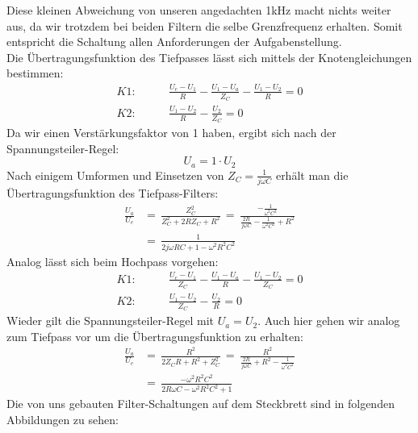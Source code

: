 Diese kleinen Abweichung von unseren angedachten 1\si{\kilo\hertz} macht nichts weiter aus, da wir trotzdem bei beiden Filtern die selbe Grenzfrequenz erhalten.
Somit entspricht die Schaltung allen Anforderungen der Aufgabenstellung.\\
Die Übertragungsfunktion des Tiefpasses lässt sich mittels der Knotengleichungen bestimmen:
\begin{align*}
K1:\qquad &\frac{U_{e}-U_{1}}{R}-\frac{U_{1}-U_{a}}{Z_{C}}-\frac{U_{1}-U_{2}}{R}=0\\
K2:\qquad &\frac{U_{1}-U_{2}}{R}-\frac{U_{2}}{Z_{C}}=0
\end{align*}
Da wir einen Verstärkungsfaktor von 1 haben, ergibt sich nach der Spannungsteiler-Regel:
$$U_{a}=1\cdot U_{2}$$
Nach einigem Umformen und Einsetzen von $Z_{C}=\frac{1}{j\omega C}$ erhält man die Übertragungsfunktion des Tiefpass-Filters:
\begin{align*}
\frac{U_{a}}{U_{e}}&=\,\frac{Z_{C}^2}{Z_{C}^2+2R Z_{C}+R^2}\,=\,\frac{-\frac{1}{\omega^2 C^2}}{\frac{2R}{j\omega C}-\frac{1}{\omega^2 C^2}+R^2}\\
&=\, \frac{1}{2j\omega RC+1-\omega^2 R^2C^2}
\end{align*}
Analog lässt sich beim Hochpass vorgehen:
\begin{align*}
K1:\qquad &\frac{U_{e}-U_{1}}{Z_{C}}-\frac{U_{1}-U_{a}}{R}-\frac{U_{1}-U_{2}}{Z_{C}}=0\\
K2:\qquad &\frac{U_{1}-U_{2}}{Z_{C}}-\frac{U_{2}}{R}=0
\end{align*}
Wieder gilt die Spannungsteiler-Regel mit $U_{a}=U_{2}$.
Auch hier gehen wir analog zum Tiefpass vor um die Übertragungsfunktion zu erhalten:
\begin{align*}
\frac{U_{a}}{U_{e}}&=\,\frac{R^2}{2Z_{C}R+R^2+Z_{C}^2}\,=\,\frac{R^2}{\frac{2R}{j\omega C}+R^2-\frac{1}{\omega^2 C^2}}\\
&=\, \frac{-\omega^2 R^2 C^2}{2R\omega C-\omega^2 R^2 C^2+1}
\end{align*} 
Die von uns gebauten Filter-Schaltungen auf dem Steckbrett sind in folgenden Abbildungen zu sehen:


